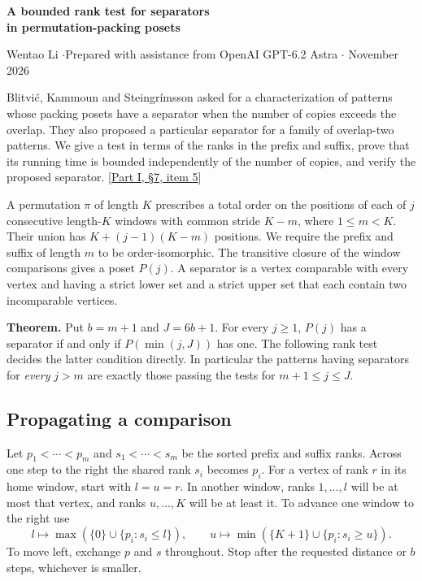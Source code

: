 \documentclass[11pt]{article}
\begin{document}
\begin{center}{\Large\bfseries A bounded rank test for separators\\ in permutation-packing posets}\par
\small Wentao Li \enspace$\cdot$\enspace Prepared with assistance from OpenAI GPT-6.2 Astra \enspace$\cdot$ November 2026\end{center}

Blitvi\'c, Kammoun and Steingr\'imsson asked for a characterization of patterns whose packing posets have a separator when the number of copies exceeds the overlap. They also proposed a particular separator for a family of overlap-two patterns. We give a test in terms of the ranks in the prefix and suffix, prove that its running time is bounded independently of the number of copies, and verify the proposed separator. [\href{https://arxiv.org/html/2610.29846v1\#S7}{Part I, \S7, item 5}]

A permutation $\pi$ of length $K$ prescribes a total order on the positions of each of $j$ consecutive length-$K$ windows with common stride $K-m$, where $1\le m<K$. Their union has $K+(j-1)(K-m)$ positions. We require the prefix and suffix of length $m$ to be order-isomorphic. The transitive closure of the window comparisons gives a poset $P(j)$. A separator is a vertex comparable with every vertex and having a strict lower set and a strict upper set that each contain two incomparable vertices.

\textbf{Theorem.} Put $b=m+1$ and $J=6b+1$. For every $j\ge1$, $P(j)$ has a separator if and only if $P(\min(j,J))$ has one. The following rank test decides the latter condition directly. In particular the patterns having separators for \emph{every} $j>m$ are exactly those passing the tests for $m+1\le j\le J$.

\subsection*{Propagating a comparison}
Let $p_1<\cdots<p_m$ and $s_1<\cdots<s_m$ be the sorted prefix and suffix ranks. Across one step to the right the shared rank $s_i$ becomes $p_i$. For a vertex of rank $r$ in its home window, start with $l=u=r$. In another window, ranks $1,\ldots,l$ will be at most that vertex, and ranks $u,\ldots,K$ will be at least it. To advance one window to the right use
\[
 l\longmapsto\max(\{0\}\cup\{p_i:s_i\le l\}),\qquad
 u\longmapsto\min(\{K+1\}\cup\{p_i:s_i\ge u\}).
\]
To move left, exchange $p$ and $s$ throughout. Stop after the requested distance or $b$ steps, whichever is smaller.
\end{document}
